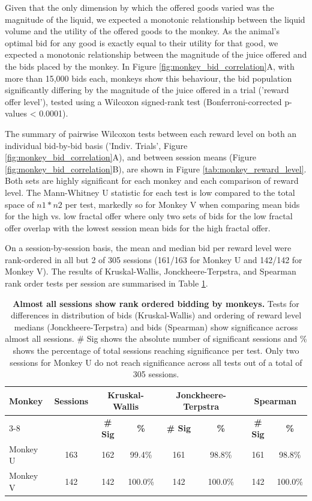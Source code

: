 Given that the only dimension by which the offered goods varied was the magnitude of the liquid, we expected a monotonic relationship between the liquid volume and the utility of the offered goods to the monkey. As the animal’s optimal bid for any good is exactly equal to their utility for that good, we expected a monotonic relationship between the magnitude of the juice offered and the bids placed by the monkey. In Figure \ref{fig:monkey_bid_correlation}A, with more than 15,000 bids each, monkeys show this behaviour, the bid population significantly differing by the magnitude of the juice offered in a trial ('reward offer level'), tested using a Wilcoxon signed-rank test (Bonferroni-corrected p-values < 0.0001).

The summary of pairwise Wilcoxon tests between each reward level on both an individual bid-by-bid basis ('Indiv. Trials', Figure \ref{fig:monkey_bid_correlation}A), and between session means (Figure \ref{fig:monkey_bid_correlation}B), are shown in Figure \ref{tab:monkey_reward_level}. Both sets are highly significant for each monkey and each comparison of reward level. The Mann-Whitney U statistic for each test is low compared to the total space of $n1 * n2$ per test, markedly so for Monkey V when comparing mean bids for the high vs. low fractal offer where only two sets of bids for the low fractal offer overlap with the lowest session mean bids for the high fractal offer.

On a session-by-session basis, the mean and median bid per reward level were rank-ordered in all but 2 of 305 sessions (161/163 for Monkey U and 142/142 for Monkey V). The results of Kruskal-Wallis, Jonckheere-Terpstra, and Spearman rank order tests per session are summarised in Table \ref{tab:monkey_significance}.

\begin{table}[htbp]
  \centering
  \small
  \begin{tabular}{lccccccc}
    \hline
    \textbf{Monkey} & \textbf{Sessions} & \multicolumn{2}{c}{\textbf{Kruskal-Wallis}} & \multicolumn{2}{c}{\textbf{Jonckheere-Terpstra}} & \multicolumn{2}{c}{\textbf{Spearman}} \\
    \cline{3-8}
    & & \textbf{\# Sig} & \textbf{\%} & \textbf{\# Sig} & \textbf{\%} & \textbf{\# Sig} & \textbf{\%} \\
    \hline
    Monkey U & 163 & 162 & 99.4\% & 161 & 98.8\% & 161 & 98.8\% \\
    Monkey V & 142 & 142 & 100.0\% & 142 & 100.0\% & 142 & 100.0\% \\
    \hline
  \end{tabular}
\caption[Almost all sessions show rank ordered bidding by monkeys.]{\textbf{Almost all sessions show rank ordered bidding by monkeys.} Tests for differences in distribution of bids (Kruskal-Wallis) and ordering of reward level medians (Jonckheere-Terpstra) and bids (Spearman) show significance across almost all sessions. \# Sig shows the absolute number of significant sessions and \% shows the percentage of total sessions reaching significance per test. Only two sessions for Monkey U do not reach significance across all tests out of a total of 305 sessions.} 
  \label{tab:monkey_significance}
\end{table}

